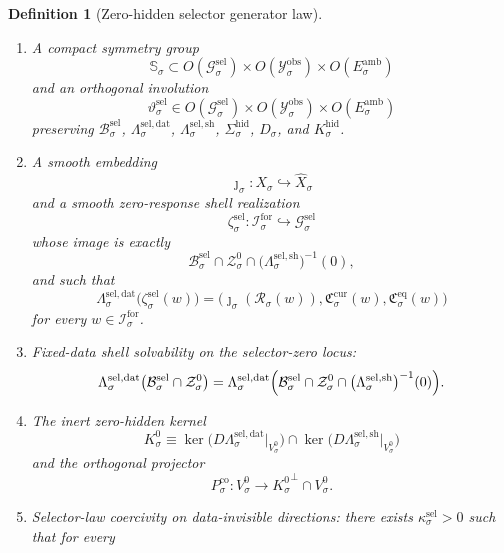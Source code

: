 \documentclass[11pt]{article}
\newcommand{\ForSpace}[1]{\mathcal I_{#1}^{\mathrm{for}}}
\newcommand{\Reduction}[1]{\mathcal R_{#1}}
\newcommand{\CurrentCarrier}[1]{\mathfrak C_{#1}^{\mathrm{cur}}}
\newcommand{\EqCarrier}[1]{\mathfrak C_{#1}^{\mathrm{eq}}}
\newcommand{\VisibleAffine}[1]{\widehat X_{#1}}
\newcommand{\DataSpace}[1]{\mathcal Y_{#1}^{\mathrm{obs}}}
\newcommand{\AmbientTarget}[1]{E_{#1}^{\mathrm{amb}}}
\newcommand{\ZeroHiddenSlice}[1]{\mathcal Z_{#1}^{0}}
\newcommand{\ZeroHiddenVec}[1]{V_{#1}^{0}}
\newcommand{\Kernel}[1]{K_{#1}^{0}}
\newcommand{\StateComp}[1]{P_{#1}^{\mathrm{co}}}
\newcommand{\GapSpace}[1]{H_{#1}}
\newcommand{\GapBody}[1]{D_{#1}}
\newcommand{\HiddenOperator}[1]{K_{#1}^{\mathrm{hid}}}
\newcommand{\GenSpace}[1]{\mathcal G_{#1}^{\mathrm{sel}}}
\newcommand{\GenBody}[1]{\mathcal B_{#1}^{\mathrm{sel}}}
\newcommand{\GenData}[1]{\Lambda_{#1}^{\mathrm{sel,dat}}}
\newcommand{\GenShell}[1]{\Lambda_{#1}^{\mathrm{sel,sh}}}
\newcommand{\HiddenSel}[1]{\Sigma_{#1}^{\mathrm{hid}}}
\newcommand{\GenSym}[1]{\mathbb S_{#1}}
\newcommand{\GenTime}[1]{\vartheta_{#1}^{\mathrm{sel}}}
\newcommand{\GenEmbed}[1]{\zeta_{#1}^{\mathrm{sel}}}
\newtheorem{definition}{Definition}
\begin{document}
\begin{definition}[Zero-hidden selector generator law]
\begin{enumerate}
\begin{equation}
    \kappa_{\sigma}^{\mathrm{hid}}\,
    \|\eta\|^{2}
    \qquad
    \text{for all }\eta\in\GapSpace{\sigma}
    \label{eq:gengap}
    \end{equation}
    for some \(\kappa_{\sigma}^{\mathrm{hid}}>0\).
    \item A compact symmetry group
    \[
    \GenSym{\sigma}\subset
    O(\GenSpace{\sigma})\times
    O(\DataSpace{\sigma})\times
    O(\AmbientTarget{\sigma})
    \]
    and an orthogonal involution
    \[
    \GenTime{\sigma}\in
    O(\GenSpace{\sigma})\times
    O(\DataSpace{\sigma})\times
    O(\AmbientTarget{\sigma})
    \]
    preserving \(\GenBody{\sigma}\), \(\GenData{\sigma}\), \(\GenShell{\sigma}\), \(\HiddenSel{\sigma}\), \(\GapBody{\sigma}\), and \(\HiddenOperator{\sigma}\).
    \item A smooth embedding
    \[
    \jmath_{\sigma}:X_{\sigma}\hookrightarrow\VisibleAffine{\sigma}
    \]
    and a smooth zero-response shell realization
    \[
    \GenEmbed{\sigma}:\ForSpace{\sigma}\hookrightarrow\GenSpace{\sigma}
    \]
    whose image is exactly
    \[
    \GenBody{\sigma}\cap
    \ZeroHiddenSlice{\sigma}\cap
    \bigl(\GenShell{\sigma}\bigr)^{-1}(0),
    \]
    and such that
    \begin{equation}
    \GenData{\sigma}\bigl(\GenEmbed{\sigma}(w)\bigr)
    =
    \bigl(
    \jmath_{\sigma}(\Reduction{\sigma}(w)),
    \CurrentCarrier{\sigma}(w),
    \EqCarrier{\sigma}(w)
    \bigr)
    \label{eq:gencompat}
    \end{equation}
    for every \(w\in\ForSpace{\sigma}\).
    \item Fixed-data shell solvability on the selector-zero locus:
    \begin{equation}
    \GenData{\sigma}\bigl(
    \GenBody{\sigma}\cap\ZeroHiddenSlice{\sigma}
    \bigr)
    =
    \GenData{\sigma}\Bigl(
    \GenBody{\sigma}\cap
    \ZeroHiddenSlice{\sigma}\cap
    \bigl(\GenShell{\sigma}\bigr)^{-1}(0)
    \Bigr).
    \label{eq:gensolvability}
    \end{equation}
    \item The inert zero-hidden kernel
    \[
    \Kernel{\sigma}
    \equiv
    \ker\bigl(D\GenData{\sigma}\big|_{\ZeroHiddenVec{\sigma}}\bigr)
    \cap
    \ker\bigl(D\GenShell{\sigma}\big|_{\ZeroHiddenVec{\sigma}}\bigr)
    \]
    and the orthogonal projector
    \[
    \StateComp{\sigma}:
    \ZeroHiddenVec{\sigma}\to
    {\Kernel{\sigma}}^{\perp}\cap\ZeroHiddenVec{\sigma}.
    \]
    \item Selector-law coercivity on data-invisible directions: there exists \(\kappa_{\sigma}^{\mathrm{sel}}>0\) such that for every

\end{enumerate}
\end{definition}
\end{document}
